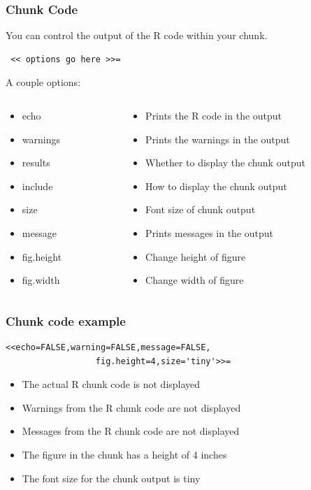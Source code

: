 \documentclass[nogin]{beamer}\usepackage[]{graphicx}\usepackage[]{color}
\begin{document}
\begin{frame}[fragile]
\frametitle{Chunk Code}
\scriptsize
You can control the output of the R code within your chunk.
\begin{verbatim} << options go here >>= \end{verbatim}
A couple options:
\begin{columns}[T]
\begin{column}{.3\textwidth}
\begin{itemize}
\item echo
\item warnings
\item results
\item include
\item size
\item message
\item fig.height
\item fig.width
\end{itemize}
\end{column}
\begin{column}{.7\textwidth}
\begin{itemize}
\item Prints the R code in the output
\item Prints the warnings in the output
\item Whether to display the chunk output
\item How to display the chunk output
\item Font size of chunk output
\item Prints messages in the output
\item Change height of figure
\item Change width of figure
\end{itemize}
\end{column}
\end{columns}
\end{frame}

\begin{frame}[fragile]
\frametitle{Chunk code example}
\begin{verbatim}<<echo=FALSE,warning=FALSE,message=FALSE,
                  fig.height=4,size='tiny'>>=\end{verbatim}
\begin{itemize}
\item The actual R chunk code is not displayed
\item Warnings from the R chunk code are not displayed
\item Messages from the R chunk code are not displayed
\item The figure in the chunk has a height of 4 inches
\item The font size for the chunk output is {\tiny tiny}
\end{itemize}
\end{frame}
\end{document}
